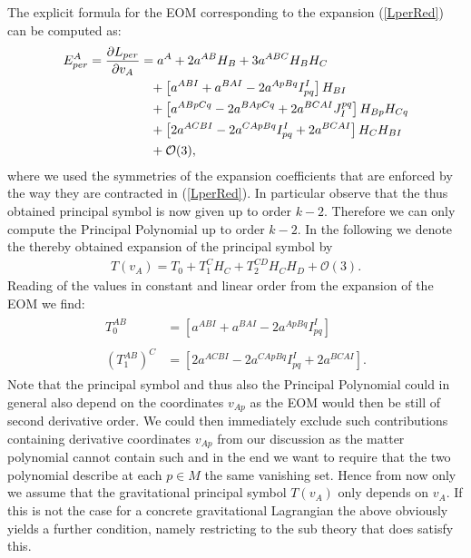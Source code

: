 \documentclass[a4paper,12pt, DIV=14, BCOR=5mm, twoside, headsepline, numbers=noenddot]{scrbook}
\begin{document}
The explicit formula for the EOM corresponding to the expansion (\ref{LperRed}) can be computed as:
\begin{align}\label{EOMPert}
    \begin{aligned}
    E_{per}^A = \frac{\partial L_{per}}{\partial v_A} &= a^A + 2 a^{AB}H_B + 3a^{ABC}H_B H_C \\
    &\hphantom{=}+ \left [a^{ABI} + a^{BAI} - 2 a^{ApBq}I_{pq}^I  \right ] H_{BI} \\
    &\hphantom{=}+ \left[a^{ABpCq} -2a^{BApCq} +2a^{BCAI} J_I^{pq} \right]H_{Bp}H_{Cq} \\
    &\hphantom{=}+ \left [2a^{ACBI} -2a^{CApBq}I_{pq}^I + 2a^{BCAI} \right ]H_C H_{BI} \\
    &\hphantom{=}+ \mathcal{O}(3),
    \end{aligned}
\end{align}
where we used the symmetries of the expansion coefficients that are enforced by the way they are contracted in (\ref{LperRed}).
In particular observe that the thus obtained principal symbol is now given up to order $k-2$. Therefore we can only compute the Principal Polynomial up to order $k-2$. In the following we denote the thereby obtained expansion of the principal symbol by 
\begin{align}
    T(v_A) = T_0 + T_1^CH_C + T_2^{CD}H_CH_D + \mathcal{O}(3).
\end{align}
Reading of the values in constant and linear order from the expansion of the EOM we find:
\begin{align}
    \begin{aligned}
    T_0^{AB} &= \left [a^{ABI} + a^{BAI} - 2 a^{ApBq}I_{pq}^I  \right ]\\
    \\
    (T_1^{AB})^C &= \left [2a^{ACBI} -2a^{CApBq}I_{pq}^I + 2a^{BCAI} \right ]. 
    \end{aligned}
\end{align}
Note that the principal symbol and thus also the Principal Polynomial could in general also depend on the coordinates $v_{Ap}$ as the EOM would then be still of second derivative order. We could then immediately exclude such contributions containing derivative coordinates $v_{Ap}$ from our discussion as the matter polynomial cannot contain such and in the end we want to require that the two polynomial describe at each $p \in M$ the same vanishing set. Hence from now only we assume that the gravitational principal symbol $T(v_A)$ only depends on $v_A$. If this is not the case for a concrete gravitational Lagrangian the above obviously yields a further condition, namely restricting to the sub theory that does satisfy this.  \\
\end{document}
